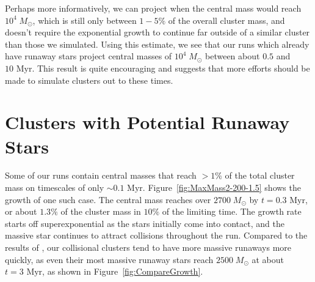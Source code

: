 \documentclass{princeton_astro_thesis}
\newcommand\Msun{\; M_\odot}
\newcommand\msun{\; M_\odot}
\newcommand\Myr{\mbox{ Myr}}
\numberwithin{equation}{section}
\begin{document}
Perhaps more informatively, we can project when the central mass would reach $10^4 \Msun$, which is still only between $1-5\%$ of the overall cluster mass, and doesn't require the exponential growth to continue far outside of a similar cluster than those we simulated.  Using this estimate, we see that our runs which already have runaway stars project central masses of $10^4 \Msun$ between about $0.5$ and $10 \Myr$. This result is quite encouraging and suggests that more efforts should be made to simulate clusters out to these times.

\section{Clusters with Potential Runaway Stars}
Some of our runs contain central masses that reach $> 1\%$ of the total cluster mass on timescales of only $\sim 0.1 \Myr$.  Figure~\ref{fig:MaxMass2-200-1.5} shows the growth of one such case. The central mass reaches over $2700 \Msun$ by $t = 0.3 \Myr$, or about $1.3 \%$ of the cluster mass in $10\%$ of the limiting time. The growth rate starts off superexponential as the stars initially come into contact, and the massive star continues to attract collisions throughout the run.  Compared to the results of \citet{2004SPZ}, our collisional clusters tend to have more massive runaways more quickly, as even their most massive runaway stars reach $2500 \msun$ at about $t = 3 \Myr$, as shown in Figure~\ref{fig:CompareGrowth}.
\end{document}
